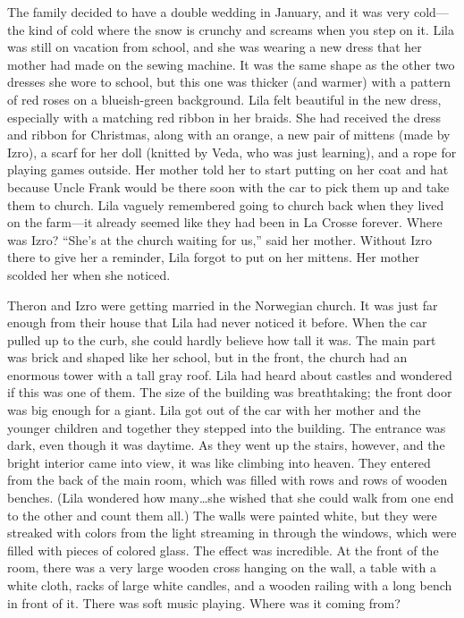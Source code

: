\documentclass[
  american,
  letterpaper,
]{book}
\begin{document}
The family decided to have a double wedding in January, and it was very
cold---the kind of cold where the snow is crunchy and screams when you
step on it. Lila was still on vacation from school, and she was wearing
a new dress that her mother had made on the sewing machine. It was the
same shape as the other two dresses she wore to school, but this one was
thicker (and warmer) with a pattern of red roses on a blueish-green
background. Lila felt beautiful in the new dress, especially with a
matching red ribbon in her braids. She had received the dress and ribbon
for Christmas, along with an orange, a new pair of mittens (made by
Izro), a scarf for her doll (knitted by Veda, who was just learning),
and a rope for playing games outside. Her mother told her to start
putting on her coat and hat because Uncle Frank would be there soon with
the car to pick them up and take them to church. Lila vaguely remembered
going to church back when they lived on the farm---it already seemed
like they had been in La Crosse forever. Where was Izro? ``She's at the
church waiting for us,'' said her mother. Without Izro there to give her
a reminder, Lila forgot to put on her mittens. Her mother scolded her
when she noticed.

Theron and Izro were getting married in the Norwegian church. It was
just far enough from their house that Lila had never noticed it before.
When the car pulled up to the curb, she could hardly believe how tall it
was. The main part was brick and shaped like her school, but in the
front, the church had an enormous tower with a tall gray roof. Lila had
heard about castles and wondered if this was one of them. The size of
the building was breathtaking; the front door was big enough for a
giant. Lila got out of the car with her mother and the younger children
and together they stepped into the building. The entrance was dark, even
though it was daytime. As they went up the stairs, however, and the
bright interior came into view, it was like climbing into heaven. They
entered from the back of the main room, which was filled with rows and
rows of wooden benches. (Lila wondered how many\ldots she wished that
she could walk from one end to the other and count them all.) The walls
were painted white, but they were streaked with colors from the light
streaming in through the windows, which were filled with pieces of
colored glass. The effect was incredible. At the front of the room,
there was a very large wooden cross hanging on the wall, a table with a
white cloth, racks of large white candles, and a wooden railing with a
long bench in front of it. There was soft music playing. Where was it
coming from?
\end{document}
